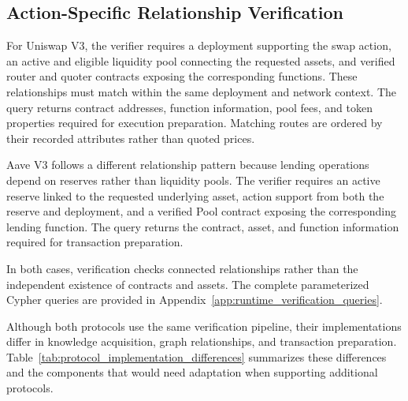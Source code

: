 \subsection{Action-Specific Relationship Verification}

For Uniswap V3, the verifier requires a deployment
supporting the swap action, an active and eligible
liquidity pool connecting the requested assets, and
verified router and quoter contracts exposing the
corresponding functions. These relationships must
match within the same deployment and network context.
The query returns contract addresses, function
information, pool fees, and token properties required
for execution preparation. Matching routes are ordered
by their recorded attributes rather than quoted prices.

Aave V3 follows a different relationship pattern because
lending operations depend on reserves rather than
liquidity pools. The verifier requires an active reserve
linked to the requested underlying asset, action support
from both the reserve and deployment, and a verified Pool
contract exposing the corresponding lending function.
The query returns the contract, asset, and function
information required for transaction preparation.

In both cases, verification checks connected relationships
rather than the independent existence of contracts and
assets. The complete parameterized Cypher queries are
provided in Appendix~\ref{app:runtime_verification_queries}.

Although both protocols use the same verification pipeline,
their implementations differ in knowledge acquisition,
graph relationships, and transaction preparation.
Table~\ref{tab:protocol_implementation_differences}
summarizes these differences and the components that
would need adaptation when supporting additional protocols.


